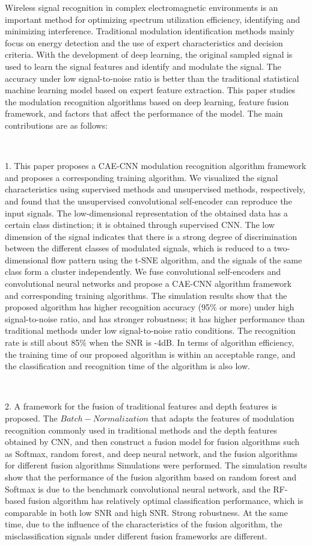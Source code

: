 \begin{englishabstract}
Wireless signal recognition in complex electromagnetic environments is an important method for optimizing spectrum utilization efficiency, identifying and minimizing interference. Traditional modulation identification methods mainly focus on energy detection and the use of expert characteristics and decision criteria. With the development of deep learning, the original sampled signal is used to learn the signal features and identify and modulate the signal. The accuracy under low signal-to-noise ratio is better than the traditional statistical machine learning model based on expert feature extraction. This paper studies the modulation recognition algorithms based on deep learning, feature fusion framework, and factors that affect the performance of the model. The main contributions are as follows:
\par~\par
1. This paper proposes a CAE-CNN modulation recognition algorithm framework and proposes a corresponding training algorithm. We visualized the signal characteristics using supervised methods and unsupervised methods, respectively, and found that the unsupervised convolutional self-encoder can reproduce the input signals. The low-dimensional representation of the obtained data has a certain class distinction; it is obtained through supervised CNN. The low dimension of the signal indicates that there is a strong degree of discrimination between the different classes of modulated signals, which is reduced to a two-dimensional flow pattern using the t-SNE algorithm, and the signals of the same class form a cluster independently. We fuse convolutional self-encoders and convolutional neural networks and propose a CAE-CNN algorithm framework and corresponding training algorithms. The simulation results show that the proposed algorithm has higher recognition accuracy (95\% or more) under high signal-to-noise ratio, and has stronger robustness; it has higher performance than traditional methods under low signal-to-noise ratio conditions. The recognition rate is still about 85\% when the SNR is -4dB. In terms of algorithm efficiency, the training time of our proposed algorithm is within an acceptable range, and the classification and recognition time of the algorithm is also low.
\par~\par
2. A framework for the fusion of traditional features and depth features is proposed. The $Batch-Normalization$ that adapts the features of modulation recognition commonly used in traditional methods and the depth features obtained by CNN, and then construct a fusion model for fusion algorithms such as Softmax, random forest, and deep neural network, and the fusion algorithms for different fusion algorithms Simulations were performed. The simulation results show that the performance of the fusion algorithm based on random forest and Softmax is due to the benchmark convolutional neural network, and the RF-based fusion algorithm has relatively optimal classification performance, which is comparable in both low SNR and high SNR. Strong robustness. At the same time, due to the influence of the characteristics of the fusion algorithm, the misclassification signals under different fusion frameworks are different.

\end{englishabstract}
